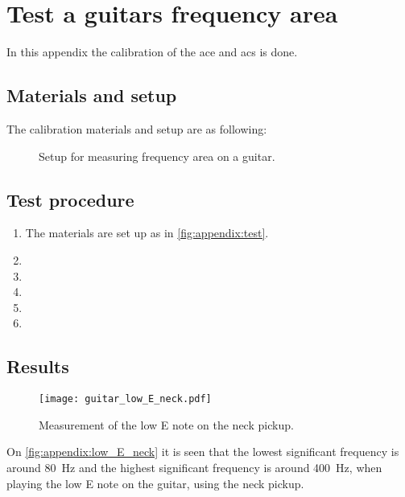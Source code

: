 \chapter{Test a guitars frequency area}
In this appendix the calibration of the \gls{ace} and \gls{acs} is done.

\section*{Materials and setup}
The calibration materials and setup are as following:


\startequipment
{}
\stopequipment


\begin{figure}[htbp!]
\centering
\def\svgwidth{\columnwidth}

\caption{Setup for measuring frequency area on a guitar.}
		\label{fig:appendix:test}
\end{figure}

\section*{Test procedure}


\begin{enumerate}
\item The materials are set up as in \autoref{fig:appendix:test}.
\item 
\item  
\item  
\item 
\item 
\end{enumerate}

\section*{Results}

\begin{figure}[htbp!]
	\centering
		\texttt{[image: guitar\_low\_E\_neck.pdf]}
		\caption{Measurement of the low E note on the neck pickup.}
		\label{fig:appendix:low_E_neck}
\end{figure}

On  \autoref{fig:appendix:low_E_neck} it is seen that the lowest significant frequency is around \SI{80}{\hertz} and the highest significant frequency is around \SI{400}{\hertz}, when playing the low E note on the guitar, using the neck pickup.

